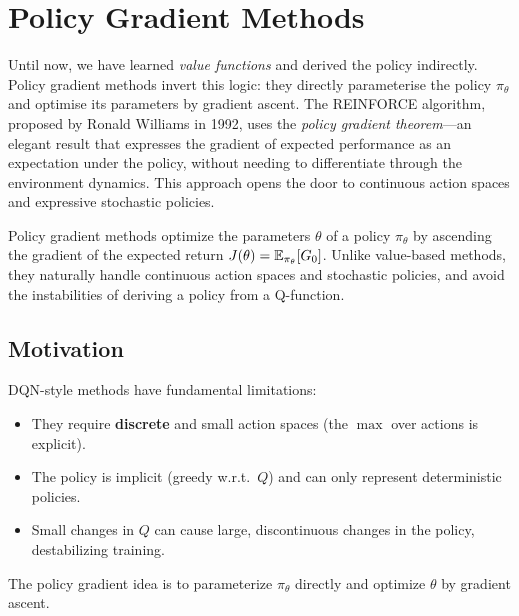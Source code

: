 \chapter{Policy Gradient Methods}
\label{ch:policy_gradient}

Until now, we have learned \emph{value functions} and derived the policy indirectly. Policy gradient methods invert this logic: they directly parameterise the policy $\pi_\theta$ and optimise its parameters by gradient ascent. The REINFORCE algorithm, proposed by Ronald Williams in 1992, uses the \emph{policy gradient theorem}---an elegant result that expresses the gradient of expected performance as an expectation under the policy, without needing to differentiate through the environment dynamics. This approach opens the door to continuous action spaces and expressive stochastic policies.

\begin{intuition}
Policy gradient methods optimize the parameters $\theta$ of a policy
$\pi_\theta$ by ascending the gradient of the expected return
$J(\theta) = \mathbb{E}_{\pi_\theta}[G_0]$. Unlike value-based methods, they
naturally handle continuous action spaces and stochastic policies, and
avoid the instabilities of deriving a policy from a Q-function.
\end{intuition}

\section{Motivation}
\label{sec:pg:motivation}

DQN-style methods have fundamental limitations:
\begin{itemize}
    \item They require \textbf{discrete} and small action spaces (the
    $\max$ over actions is explicit).
    \item The policy is implicit (greedy w.r.t.\ $Q$) and can only
    represent deterministic policies.
    \item Small changes in $Q$ can cause large, discontinuous changes in
    the policy, destabilizing training.
\end{itemize}

The policy gradient idea is to parameterize $\pi_\theta$ directly and
optimize $\theta$ by gradient ascent.

